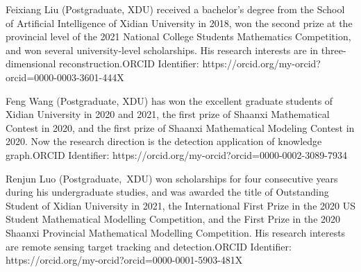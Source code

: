 \documentclass[journal]{IEEEtran}
\begin{document}
 \begin{IEEEbiography}{Feixiang Liu}
(Postgraduate, XDU) received a bachelor's degree from the School of Artificial Intelligence of Xidian University in 2018, won the second prize at the provincial level of the 2021 National College Students Mathematics Competition, and won several university-level scholarships. His research interests are in three-dimensional reconstruction.ORCID Identifier: https://orcid.org/my-orcid?orcid=0000-0003-3601-444X
\end{IEEEbiography}

  \begin{IEEEbiography}{Feng Wang}
(Postgraduate, XDU) has won the excellent graduate students of Xidian University in 2020 and 2021, the first prize of Shaanxi Mathematical Contest in 2020, and the first prize of Shaanxi Mathematical Modeling Contest in 2020. Now the research direction is the detection application of knowledge graph.ORCID Identifier: https://orcid.org/my-orcid?orcid=0000-0002-3089-7934
 \end{IEEEbiography}

 \begin{IEEEbiography}{Renjun Luo}
(Postgraduate,~XDU) won scholarships for four consecutive years during his undergraduate studies, and was awarded the title of Outstanding Student of Xidian University in 2021, the International First Prize in the 2020 US Student Mathematical Modelling Competition, and the First Prize in the 2020 Shaanxi Provincial Mathematical Modelling Competition. His research interests are remote sensing target tracking and detection.ORCID Identifier: https://orcid.org/my-orcid?orcid=0000-0001-5903-481X
\end{IEEEbiography}
\end{document}
